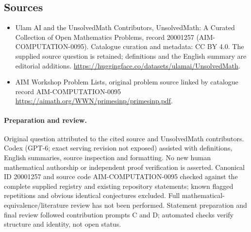 \documentclass[11pt]{article}
\begin{document}
\subsection{Sources}
\begin{itemize}
\item[\hypertarget{source:20001257:1}{S1}] Ulam AI and the UnsolvedMath Contributors, UnsolvedMath: A Curated Collection of Open Mathematics Problems, record 20001257 (AIM-COMPUTATION-0095). Catalogue curation and metadata: CC BY 4.0. The supplied source question is retained; definitions and the English summary are editorial additions.
\url{https://huggingface.co/datasets/ulamai/UnsolvedMath}.
\item[\hypertarget{source:20001257:2}{S2}] AIM Workshop Problem Lists, original problem source linked by catalogue record AIM-COMPUTATION-0095
\url{https://aimath.org/WWN/primesinp/primesinp.pdf}.
\end{itemize}
\paragraph{Preparation and review.}
Original question attributed to the cited source and UnsolvedMath contributors. Codex (GPT-6; exact serving revision not exposed) assisted with definitions, English summaries, source inspection and formatting. No new human mathematical authorship or independent proof verification is asserted. Canonical ID 20001257 and source code AIM-COMPUTATION-0095 checked against the complete supplied registry and existing repository statements; known flagged repetitions and obvious identical conjectures excluded. Full mathematical-equivalence/literature review has not been performed. Statement preparation and final review followed contribution prompts C and D; automated checks verify structure and identity, not open status.
\label{end:20001257}
\end{document}
